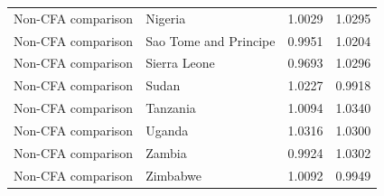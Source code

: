 \begin{table}
\begin{tabular}[t]{llrr}
Non-CFA comparison & Nigeria & 1.0029 & 1.0295\\
Non-CFA comparison & Sao Tome and Principe & 0.9951 & 1.0204\\
Non-CFA comparison & Sierra Leone & 0.9693 & 1.0296\\
\addlinespace
Non-CFA comparison & Sudan & 1.0227 & 0.9918\\
Non-CFA comparison & Tanzania & 1.0094 & 1.0340\\
Non-CFA comparison & Uganda & 1.0316 & 1.0300\\
Non-CFA comparison & Zambia & 0.9924 & 1.0302\\
Non-CFA comparison & Zimbabwe & 1.0092 & 0.9949\\
\bottomrule
\end{tabular}
\end{table}